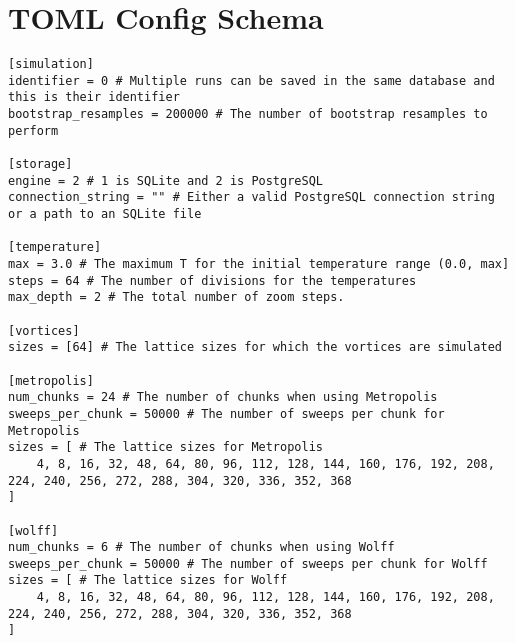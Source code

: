 \chapter{TOML Config Schema}\label{chap:config}
\begin{verbatim}
[simulation]
identifier = 0 # Multiple runs can be saved in the same database and this is their identifier
bootstrap_resamples = 200000 # The number of bootstrap resamples to perform

[storage]
engine = 2 # 1 is SQLite and 2 is PostgreSQL
connection_string = "" # Either a valid PostgreSQL connection string or a path to an SQLite file

[temperature]
max = 3.0 # The maximum T for the initial temperature range (0.0, max]
steps = 64 # The number of divisions for the temperatures
max_depth = 2 # The total number of zoom steps. 

[vortices]
sizes = [64] # The lattice sizes for which the vortices are simulated

[metropolis]
num_chunks = 24 # The number of chunks when using Metropolis
sweeps_per_chunk = 50000 # The number of sweeps per chunk for Metropolis
sizes = [ # The lattice sizes for Metropolis
	4, 8, 16, 32, 48, 64, 80, 96, 112, 128, 144, 160, 176, 192, 208, 224, 240, 256, 272, 288, 304, 320, 336, 352, 368
]

[wolff]
num_chunks = 6 # The number of chunks when using Wolff
sweeps_per_chunk = 50000 # The number of sweeps per chunk for Wolff
sizes = [ # The lattice sizes for Wolff
	4, 8, 16, 32, 48, 64, 80, 96, 112, 128, 144, 160, 176, 192, 208, 224, 240, 256, 272, 288, 304, 320, 336, 352, 368
]
\end{verbatim}